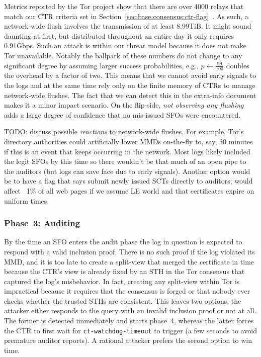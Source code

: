Metrics reported by the Tor project show that there are over 4000 relays that
match our CTR criteria set in
Section~\ref{sec:base:consensus:ctr-flag}~\cite{relay-by-flag}.  As such, a
network-wide flush involves the transmission of at least 8.99TiB.  It might
sound daunting at first, but distributed throughout an entire day it only
requires 0.91Gbps.  Such an attack is within our threat model because it does
not make Tor unavailable.  Notably the ballpark of these numbers do not
change to any significant degree by assuming larger success probabilities, e.g.,
$p\gets\frac{99}{100}$ doubles the overhead by a factor of two.  This means
that we cannot avoid early signals to the logs and at the same time rely only on
the finite memory of CTRs to manage network-wide flushes.  The fact that we can
detect this in the extra-info document makes it a minor impact scenario.  On the
flip-side, \emph{not observing any flushing} adds a large degree of confidence
that no mis-issued SFOs were encountered.

TODO: discuss possible \emph{reactions} to network-wide flushes.  For example,
Tor's directory authorities could artificially lower MMDs on-the-fly to, say, 30
minutes if this is an event that keeps occurring in the network.  Most logs
likely included the legit SFOs by this time so there wouldn't be that much of an
open pipe to the auditors (but logs can save face due to early signals).
Another option would be to have a flag that says submit newly issued SCTs
directly to auditors; would affect ~1\% of all web pages if we assume LE world
and that certificates expire on uniform times.

\subsubsection{Phase~3: Auditing} \label{sec:analysis:pr:phase3}
By the time an SFO enters the audit phase the log in question is expected to
respond with a valid inclusion proof.  There is no such proof if the log
violated its MMD, and it is too late to create a split-view that merged the
certificate in time because the CTR's view is already fixed by an STH in the
Tor consensus that captured the log's misbehavior.  In fact, creating any
split-view within Tor is impractical because it requires that the consensus is
forged or that nobody ever checks whether the trusted STHs are consistent.
This leaves two options: the attacker either responds to the query with an
invalid inclusion proof or
	not at all.
The former is detected immediately and starts phase~4, whereas the latter forces
the CTR to first wait for \texttt{ct-watchdog-timeout} to trigger (a few seconds
to avoid premature auditor reports).  A rational attacker prefers the second
option to win time.

